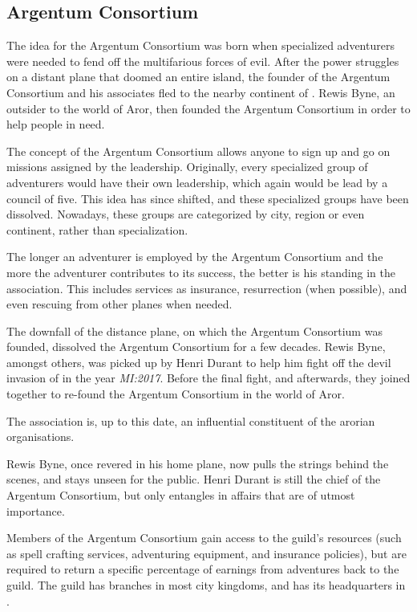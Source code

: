 \subsection{Argentum Consortium}
\label{sec:Argentum Consortium}

The idea for the Argentum Consortium was born when specialized adventurers were
needed to fend off the multifarious forces of evil. After the power struggles on
a distant plane that doomed an entire island, the founder of the Argentum
Consortium and his associates fled to the nearby continent of
. Rewis Byne, an outsider to the world of Aror, then
founded the Argentum Consortium in order to help people in need.

The concept of the Argentum Consortium allows anyone to sign up and go on
missions assigned by the leadership. Originally, every specialized group of
adventurers would have their own leadership, which again would be lead by a
council of five. This idea has since shifted, and these specialized groups have
been dissolved. Nowadays, these groups are categorized by city, region or even
continent, rather than specialization.

The longer an adventurer is employed by the Argentum Consortium and the more the
adventurer contributes to its success, the better is his standing in the
association. This includes services as insurance, resurrection (when possible),
and even rescuing from other planes when needed.

The downfall of the distance plane, on which the Argentum Consortium was
founded, dissolved the Argentum Consortium for a few decades. Rewis Byne,
amongst others, was picked up by Henri Durant to help him fight off the devil
invasion of  in the year \emph{MI:2017}. Before the final
fight, and afterwards, they joined together to re-found the Argentum
Consortium in the world of Aror.

The association is, up to this date, an influential constituent of the arorian
organisations.

Rewis Byne, once revered in his home plane, now pulls the strings behind the
scenes, and stays unseen for the public. Henri Durant is still the chief of the
Argentum Consortium, but only entangles in affairs that are of utmost
importance.

Members of the Argentum Consortium gain access to the guild's resources (such
as spell crafting services, adventuring equipment, and insurance policies),
but are required to return a specific percentage of earnings from adventures
back to the guild. The guild has branches in most city kingdoms, and has its
headquarters in .

